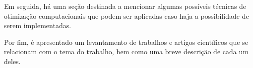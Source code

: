 Em seguida, há uma seção destinada a mencionar algumas possíveis técnicas de otimização computacionais que podem ser aplicadas caso haja a possibilidade de serem implementadas.

Por fim, é apresentado um levantamento de trabalhos e artigos científicos que se relacionam com o tema do trabalho, bem como uma breve descrição de cada um deles.